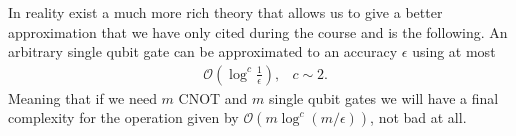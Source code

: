 In reality exist a much more rich theory that allows us to give a better approximation that we have only cited during the course and is the following.
{
    An arbitrary single qubit gate can be approximated to an accuracy $\epsilon$ using at most
    \begin{align}
        &\mathcal{O}\left(\log^c\frac{1}{\epsilon}\right), &c \sim 2.
    \end{align}
}
\noindent
Meaning that if we need $m$ CNOT and $m$ single qubit gates we will have a final complexity for the operation given by $\mathcal{O}\left( m\log^c(m/\epsilon) \right)$, not bad at all.